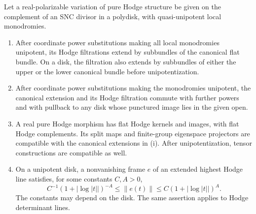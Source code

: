 \begin{lemma}
\label{hodge:purerules}
Let a real-polarizable variation of pure Hodge structure be given on
the complement of an SNC divisor in a polydisk, with quasi-unipotent
local monodromies.
\begin{enumerate}[label=\textup{(\roman*)}]
\item
After coordinate power substitutions making all local monodromies
unipotent, its Hodge filtrations extend by subbundles of the canonical
flat bundle.  On a disk, the filtration also extends by subbundles
of either the upper or the lower canonical bundle before
unipotentization.
\item
After coordinate power substitutions making the monodromies
unipotent, the canonical extension and its Hodge filtration commute
with further powers and with pullback to any disk whose punctured
image lies in the given open.
\item
A real pure Hodge morphism has flat Hodge kernels and images, with flat
Hodge complements.  Its split maps and finite-group eigenspace
projectors are compatible with the canonical extensions in
\textup{(i)}.  After unipotentization, tensor constructions are
compatible as well.
\item
On a unipotent disk, a nonvanishing frame \(e\) of an extended highest
Hodge line satisfies, for some constants \(C,A>0\),
\begin{equation}
 C^{-1}(1+|\log|t||)^{-A}
 \leq \|e(t)\|
 \leq C(1+|\log|t||)^A.
 \label{hodge:logbounds}
\end{equation}
The constants may depend on the disk.  The same assertion applies to
Hodge determinant lines.
\end{enumerate}
\end{lemma}

